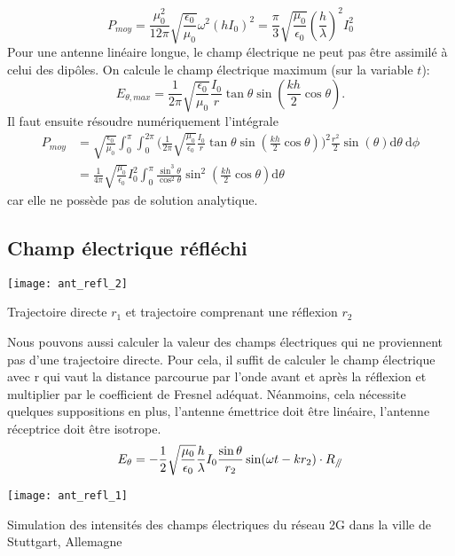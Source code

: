 \[P_{moy}=\frac{\mu_0^2}{12\pi}\sqrt{\frac{\epsilon_{0}}{\mu_0}}
\omega^2(hI_0)^2=\frac{\pi}{3}\sqrt{\frac{\mu_0}{\epsilon_{0}}}\left(\frac{h}{\lambda}\right)^2I_0^2
\]
Pour une antenne linéaire longue, le champ électrique ne peut pas être assimilé à celui des dipôles. On calcule le champ électrique maximum (sur la variable $t$):
\[E_{\theta,max}=\frac{1}{2\pi}\sqrt{\frac{\epsilon_{0}}{\mu_0}}\frac{I_0}{r}\tan \theta\sin\left(\frac{kh}{2}\cos\theta\right).\]
Il faut ensuite résoudre numériquement l'intégrale 
\begin{align*}
P_{moy}&=\sqrt{\frac{\epsilon_{0}}{\mu_0}}\int_0^{\pi}\int_0^{2\pi}\bigg(\frac{1}{2\pi}\sqrt{\frac{\mu_0}{\epsilon_{0}}}\frac{I_0}{r}\tan \theta\sin\left(\frac{kh}{2}\cos\theta\right)\bigg)^2\frac{r^2}{2}\sin(\theta)\textrm{d}\theta\:\textrm{d}\phi\\
&=\frac{1}{4\pi} \sqrt{\frac{\mu_0}{\epsilon_{0}}}I_0^2\int_0^{\pi}\frac{\sin^3\theta}{\cos^2\theta}\sin^2\left(\frac{kh}{2}\cos\theta\right)\textrm{d}\theta
\end{align*}
car elle ne possède pas de solution analytique.

\subsection{Champ électrique réfléchi}

\begin{marginfigure}[-2cm]
	\texttt{[image: ant\_refl\_2]}
	\caption{Trajectoire directe $r_1$ et trajectoire comprenant une réflexion $r_2$}
\end{marginfigure}
Nous pouvons aussi calculer la valeur des champs électriques qui ne proviennent pas d'une trajectoire directe. Pour cela, il suffit de calculer le champ électrique avec r qui vaut la distance parcourue par l'onde avant et après la réflexion et multiplier par le coefficient de Fresnel adéquat. Néanmoins, cela nécessite quelques suppositions en plus, l'antenne émettrice doit être linéaire, l'antenne réceptrice doit être isotrope.
\[E_\theta=-\frac{1}{2}\sqrt{\frac{\mu_0}{\epsilon_{0}}}\frac{h}{\lambda}I_0\frac{\sin \theta}{r_{2}}\sin(\omega t-kr_{2})\cdot R_{\mathbin{/\mkern-5mu/}}\]
\begin{marginfigure}[-2cm]
	\texttt{[image: ant\_refl\_1]}
	\caption{Simulation des intensités des champs électriques du réseau 2G dans la ville de Stuttgart, Allemagne}
\end{marginfigure} 

